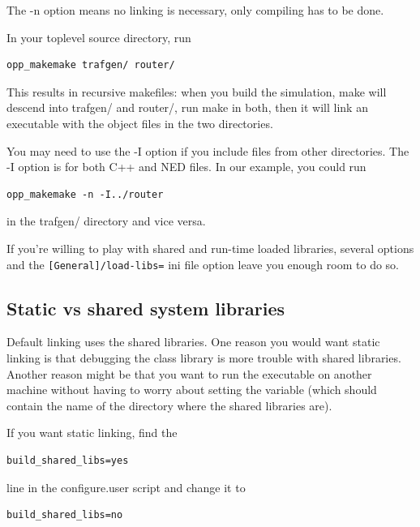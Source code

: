 The -n option means no linking is necessary, only compiling has 
to be done.


In your toplevel source directory, run

\begin{Verbatim}
opp_makemake trafgen/ router/
\end{Verbatim}

This results in recursive makefiles: when you build the simulation, make 
will descend into trafgen/ and router/, run make in both, then 
it will link an executable with the object files in the two directories.


You may need to use the -I option if you include files from other
directories. The -I option is for both C++ and NED
files. In our example, you could run

\begin{Verbatim}
opp_makemake -n -I../router
\end{Verbatim}

in the trafgen/ directory and vice versa.


If you're willing to play with shared and run-time loaded libraries,
several  options and the
\texttt{[General]/load-libs=} ini file option leave you enough room to
do so.





\subsection{Static vs shared {\opp} system libraries}

Default linking uses the shared libraries. One
reason you would want static linking is that
debugging the {\opp} class library is more trouble
with shared libraries. Another reason might be that you want to run
the executable on another machine without having to worry about
setting the  variable (which should contain the name
of the directory where the {\opp} shared libraries are).

If you want static linking, find the

\begin{Verbatim}
build_shared_libs=yes
\end{Verbatim}


line in the configure.user script and change it to

\begin{Verbatim}
build_shared_libs=no
\end{Verbatim}

